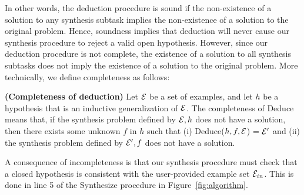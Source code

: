 In other words, the deduction procedure is sound if the non-existence
of a solution to any  synthesis subtask implies the
non-existence of a solution to the original problem. Hence, soundness
implies that deduction will never cause our synthesis
procedure to reject a valid open hypothesis. However, since our
deduction procedure is not complete, the existence of a solution to
all  synthesis subtasks does not imply the existence of a
solution to the original problem. More technically, we define
{completeness} as follows:

\begin{definition}{\bf (Completeness of deduction)} Let $\mathcal{E}$ be a set of
  examples, and let $h$ be a hypothesis that is an inductive
  generalization of $\mathcal{E}$.  The completeness of {\sc Deduce} means that,
  if the synthesis problem defined by $\mathcal{E}, h$ does not have a solution,
  then there exists some unknown $f$ in $h$ such that (i) {\sc Deduce}($h,
  f, \mathcal{E}$) = $\mathcal{E}'$ and (ii) the synthesis problem defined by $\mathcal{E}', f$ does not
  have a solution.
\end{definition}

A consequence of incompleteness is that our synthesis procedure must
check that a closed hypothesis is consistent with the
user-provided example set $\mathcal{E}_{in}$. This is done in line 5 of the
{\sc Synthesize} procedure in Figure~\ref{fig:algorithm}.


